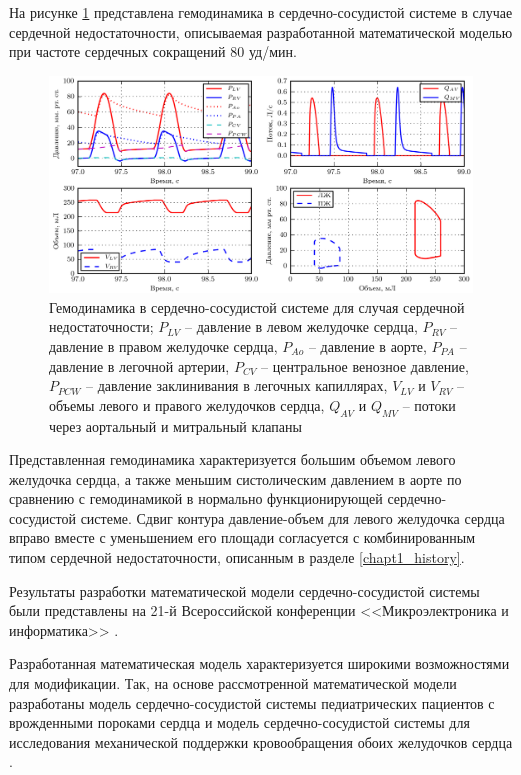 На рисунке \ref{img:cvs_hemodynamics} представлена гемодинамика в сердечно-сосудистой системе в случае сердечной недостаточности, описываемая разработанной математической моделью при частоте сердечных сокращений 80 уд/мин.

\begin{figure}[ht] 
  \center
  \includegraphics [scale=1.0] {../images/c2_cvs_hemodynamics}
  \caption{Гемодинамика в сердечно-сосудистой системе для случая сердечной недостаточности; $P_{LV}$ -- давление в левом желудочке сердца, $P_{RV}$ -- давление в правом желудочке сердца, $P_{Ao}$ -- давление в аорте, $P_{PA}$ -- давление в легочной артерии, $P_{CV}$ -- центральное венозное давление, $P_{PCW}$ -- давление заклинивания в легочных капиллярах, $V_{LV}$ и $V_{RV}$ -- объемы левого и правого желудочков сердца, $Q_{AV}$ и $Q_{MV}$ -- потоки через аортальный и митральный клапаны}
  \label{img:cvs_hemodynamics}
\end{figure}

Представленная гемодинамика характеризуется большим объемом левого желудочка сердца, а также меньшим систолическим давлением в аорте по сравнению с гемодинамикой в нормально функционирующей сердечно-сосудистой системе. Сдвиг контура давление-объем для левого желудочка сердца вправо вместе с уменьшением его площади согласуется с комбинированным типом сердечной недостаточности, описанным в разделе \ref{chapt1_history}.


Результаты разработки математической модели сердечно-сосудистой системы были представлены на 21-й Всероссийской конференции <<Микроэлектроника и информатика>> \cite{miee_2014}.

Разработанная математическая модель характеризуется широкими возможностями для модификации. Так, на основе рассмотренной математической модели разработаны модель сердечно-сосудистой системы педиатрических пациентов с врожденными пороками сердца \cite{mt4_2016} и модель сердечно-сосудистой системы для исследования механической поддержки кровообращения обоих желудочков сердца \cite{rgc_2016}.

